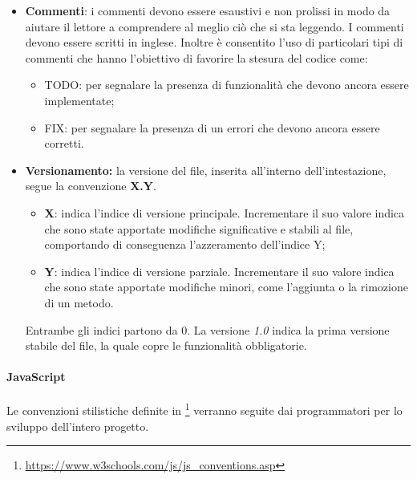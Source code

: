 \begin{itemize}
	\item \textbf{Commenti}: i commenti devono essere esaustivi e non prolissi in modo da aiutare il lettore a comprendere al meglio ciò che si sta leggendo. I commenti devono essere scritti in inglese. Inoltre è consentito l'uso di particolari tipi di commenti che hanno l'obiettivo di favorire la stesura del codice come:
	\begin{itemize}
		\item TODO: per segnalare la presenza di funzionalità che devono ancora essere implementate;
		\item FIX: per segnalare la presenza di un errori che devono ancora essere corretti.
	\end{itemize}

	\item \textbf{Versionamento:} la versione del file, inserita all'interno dell'intestazione, segue la convenzione \textbf{X.Y}.
	\begin{itemize}
		\item{\textbf{X}: indica l'indice di versione principale. Incrementare il suo valore indica che sono state apportate modifiche significative e stabili al file, comportando di conseguenza l'azzeramento dell'indice Y;}
		\item{\textbf{Y}: indica l'indice di versione parziale. Incrementare il suo valore indica che sono state apportate modifiche minori, come l'aggiunta o la rimozione di un metodo.}
	\end{itemize}
	Entrambe gli indici partono da 0. La versione \emph{1.0} indica la prima versione stabile del file, la quale copre le funzionalità obbligatorie.
\end{itemize}

\paragraph{JavaScript}\Spazio
Le convenzioni stilistiche definite in \footnote{\url{https://www.w3schools.com/js/js_conventions.asp}} verranno seguite dai programmatori per lo sviluppo dell'intero progetto.

